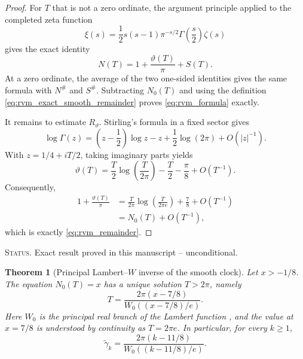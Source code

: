 \documentclass[11pt]{amsart}
\numberwithin{equation}{section}
\theoremstyle{plain}
\newtheorem{theorem}{Theorem}[section]
\theoremstyle{definition}
\theoremstyle{remark}
\newcommand{\1}{\mathbf{1}}
\newcommand{\statusnote}[1]{%
  \par\smallskip\noindent
  \begingroup\footnotesize\textsc{Status.} #1\endgroup
  \par\smallskip}
\begin{document}
\begin{proof}
For \(T\) that is not a zero ordinate, the argument principle applied to
the completed zeta function
\begin{equation}
\xi(s)
=
\frac12s(s-1)\pi^{-s/2}\Gamma\!\left(\frac s2\right)\zeta(s)
\label{eq:rvm_xi_definition}
\end{equation}
gives the exact identity
\begin{equation}
N(T)
=
1+\frac{\vartheta(T)}{\pi}+S(T).
\label{eq:rvm_theta_exact}
\end{equation}
At a zero ordinate, the average of the two one-sided identities gives the
same formula with \(N^{\#}\) and \(S^{\#}\).  Subtracting \(N_0(T)\) and
using the definition \eqref{eq:rvm_exact_smooth_remainder} proves
\eqref{eq:rvm_formula} exactly.

It remains to estimate \(R_\vartheta\).  Stirling's formula in a fixed
sector gives
\begin{equation}
\log\Gamma(z)
=
\left(z-\frac12\right)\log z-z+\frac12\log(2\pi)
+
O(|z|^{-1}).
\label{eq:rvm_stirling}
\end{equation}
With \(z=1/4+iT/2\), taking imaginary parts yields
\begin{equation}
\vartheta(T)
=
\frac T2\log\!\left(\frac{T}{2\pi}\right)
-
\frac T2
-
\frac\pi8
+
O(T^{-1}).
\label{eq:rvm_theta_asymptotic}
\end{equation}
Consequently,
\begin{align}
1+\frac{\vartheta(T)}{\pi}
&=
\frac{T}{2\pi}\log\!\left(\frac{T}{2\pi e}\right)
+\frac78+O(T^{-1})
\label{eq:rvm_substitution_one}
\\
&=
N_0(T)+O(T^{-1}),
\label{eq:rvm_substitution_two}
\end{align}
which is exactly \eqref{eq:rvm_remainder}.
\end{proof}

\statusnote{Exact result proved in this manuscript -- unconditional.}
\begin{theorem}[Principal Lambert--\(W\) inverse of the smooth clock]
\label{thm:rvm_lambert_inverse}
Let \(x>-1/8\).  The equation \(N_0(T)=x\) has a unique solution
\(T>2\pi\), namely
\begin{equation}
\boxed{
T
=
\frac{2\pi(x-7/8)}
{W_0\!\left((x-7/8)/e\right)}.
}
\label{eq:rvm_lambert_inverse}
\end{equation}
Here \(W_0\) is the principal real branch of the Lambert function
\cite{Corless1996}, and the value at \(x=7/8\) is
understood by continuity as \(T=2\pi e\).  In particular, for every
\(k\geq1\),
\begin{equation}
\widetilde\gamma_k
=
\frac{2\pi(k-11/8)}
{W_0\!\left((k-11/8)/e\right)}.
\label{eq:rvm_gamma_tilde}
\end{equation}
\end{theorem}
\end{document}
